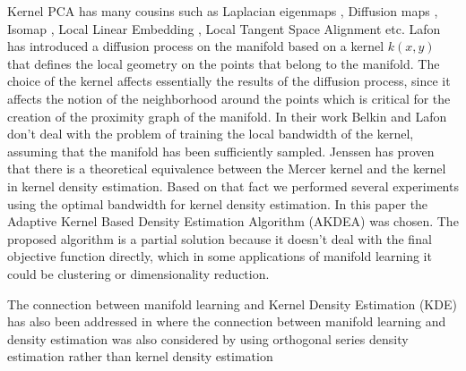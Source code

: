 \documentclass[12pt,letterpaper,doublespaced,ETD,dvips,proposal]{gtthesis}
\begin{document}
\begin{Body}
Kernel PCA has many cousins such as Laplacian eigenmaps
\cite{Belkin}, Diffusion maps  \cite{Lafon}, Isomap \cite{tenenbaum2000ggf},
Local Linear Embedding \cite{roweis1993ndr},
Local Tangent Space Alignment \cite{zhang2002pma} etc.
Lafon has introduced a diffusion process on the manifold based on a
kernel $k(x,y)$ that defines the local geometry on the points that
belong to the manifold. The choice of the kernel affects essentially
the results of the diffusion process, since it affects the notion of
the neighborhood around the points which is critical for the
creation of the proximity graph of the manifold. In their work
Belkin \cite{Belkin} and Lafon don't deal with the problem of training the local
bandwidth of the kernel, assuming that the manifold has been
sufficiently sampled. Jenssen \cite{jenssen17lpd} has proven  that
there is a theoretical equivalence between the Mercer kernel and the
kernel in kernel density estimation. Based on that fact we performed
several experiments using the optimal bandwidth for kernel density
estimation. In this paper the Adaptive Kernel Based Density
Estimation Algorithm (AKDEA) \cite{Silverman} was chosen. The
proposed algorithm is a partial solution because it doesn't deal
with the final objective function directly, which in some
applications of manifold learning it could be clustering or
dimensionality reduction.

The connection between manifold learning and Kernel Density Estimation (KDE) has also been addressed in \cite{girolami2002osd} where the connection between manifold
learning and density estimation was also considered by using
orthogonal series density estimation rather than kernel density
estimation



\end{Body}
\end{document}
